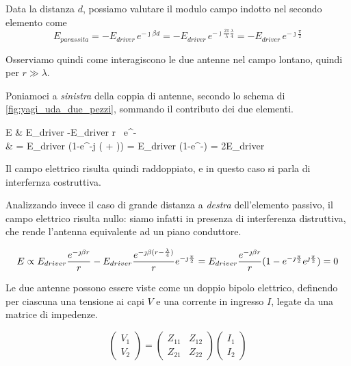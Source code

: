 Data la distanza $d$, possiamo valutare il modulo campo indotto nel secondo elemento come
\begin{equation}
	E_{parassita}
	= -E_{driver} \,e^{-\jmath \beta d}
	= -E_{driver} \,e^{-\jmath \frac{2 \pi}{\lambda} \frac{\lambda}{4}}
	= -E_{driver} \, e^{-\jmath \frac{\pi}{2}}
\end{equation}

Osserviamo quindi come interagiscono le due antenne nel campo lontano, quindi per $r \gg \lambda$.

Poniamoci a \emph{sinistra} della coppia di antenne, secondo lo schema di \autoref{fig:yagi_uda_due_pezzi}, sommando il contributo dei due elementi.
\begin{esp}
	E
	& \propto E_{driver}
	-E_{driver}
	 {r}
	\, e^{-\jmath{}} \\
	& = E_{driver}  (1-e^{-j (\beta{} + )})
	= E_{driver} (1-e^{-\jmath\pi})
	= 2E_{driver}
\end{esp}

Il campo elettrico risulta quindi raddoppiato, e in questo caso si parla di interfernza costruttiva.

Analizzando invece il caso di grande distanza a \emph{destra} dell'elemento passivo, il campo elettrico risulta nullo: siamo infatti in presenza di interferenza distruttiva, che rende l'antenna equivalente ad un piano conduttore.

\begin{equation}
	E
	\propto E_{driver} \frac{e^{-\jmath \beta r}}{r}
	- E_{driver} \frac{e^{-\jmath\beta(r-\frac{\lambda}{4})}}{r} e^{-\jmath\frac{\pi}{2}}
	= E_{driver}\frac{e^{-\jmath \beta r}}{r} (1-e^{-\jmath\frac{\pi}{2}} e^{\jmath\frac{\pi}{2}})
	= 0
\end{equation}

Le due antenne possono essere viste come un doppio bipolo elettrico, definendo per ciascuna una tensione ai capi $V$ e una corrente in ingresso $I$, legate da una matrice di impedenze.

\begin{equation}
	\left(
		\begin{array}{c}
			V_1 \\
			V_2
		\end{array}
	\right)
	= \left(
		\begin{array}{cc}
			Z_{11} & Z_{12} \\
			Z_{21} & Z_{22}
		\end{array}
	\right)
	\left(
		\begin{array}{cc}
			I_1 \\
			I_2
		\end{array}
	\right)
\end{equation}

